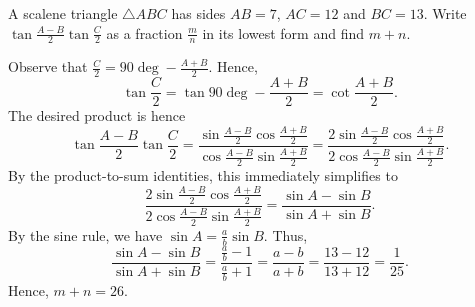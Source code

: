 \begin{question}[26]\label{A::2024-S-1-25}
    A scalene triangle $\triangle ABC$ has sides $AB = 7$, $AC = 12$ and $BC = 13$. Write $\tan \frac{A-B}{2} \tan \frac{C}{2}$ as a fraction $\frac{m}{n}$ in its lowest form and find $m + n$.

    \begin{center}
    \end{center}
\end{question}
\begin{solution*}
    Observe that $\frac{C}{2} = 90\deg - \frac{A + B}{2}$. Hence, \[\tan \frac{C}{2} = \tan{90\deg - \frac{A + B}{2}} = \cot \frac{A + B}{2}.\] The desired product is hence \[\tan \frac{A-B}{2} \tan \frac{C}{2} = \frac{\sin \frac{A-B}{2} \cos \frac{A+B}{2}}{\cos \frac{A-B}{2} \sin \frac{A+B}{2}} = \frac{2\sin \frac{A-B}{2} \cos \frac{A+B}{2}}{2\cos \frac{A-B}{2} \sin \frac{A+B}{2}}.\] By the product-to-sum identities, this immediately simplifies to \[\frac{2\sin \frac{A-B}{2} \cos \frac{A+B}{2}}{2\cos \frac{A-B}{2} \sin \frac{A+B}{2}} = \frac{\sin A - \sin B}{\sin A + \sin B}.\] By the sine rule, we have $\sin A = \frac{a}{b} \sin B$. Thus, \[\frac{\sin A - \sin B}{\sin A + \sin B} = \frac{\frac{a}{b} - 1}{\frac{a}{b} + 1} = \frac{a - b}{a + b} = \frac{13 - 12}{13 + 12} = \frac{1}{25}.\] Hence, $m + n = 26$.
\end{solution*}